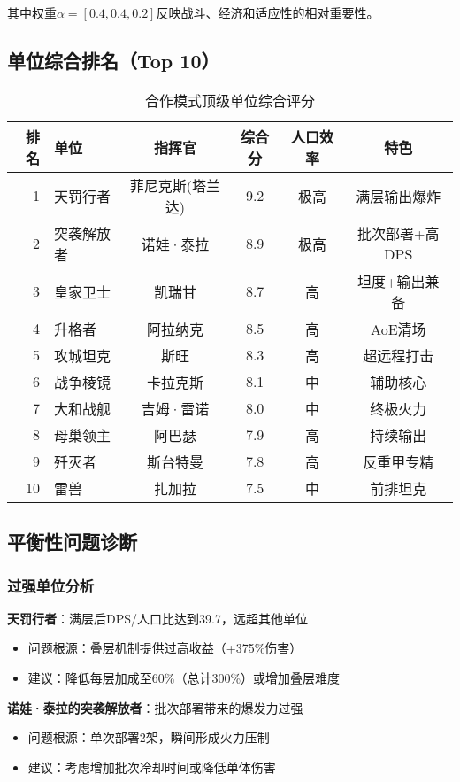 \documentclass[a4paper,12pt]{article}
\begin{document}
其中权重$\alpha = [0.4, 0.4, 0.2]$反映战斗、经济和适应性的相对重要性。

\subsection{单位综合排名（Top 10）}
\begin{table}[h]
\centering
\caption{合作模式顶级单位综合评分}
\begin{tabular}{rlcccc}
\toprule
\textbf{排名} & \textbf{单位} & \textbf{指挥官} & \textbf{综合分} & \textbf{人口效率} & \textbf{特色} \\
\midrule
1 & 天罚行者 & 菲尼克斯(塔兰达) & 9.2 & 极高 & 满层输出爆炸 \\
2 & 突袭解放者 & 诺娃·泰拉 & 8.9 & 极高 & 批次部署+高DPS \\
3 & 皇家卫士 & 凯瑞甘 & 8.7 & 高 & 坦度+输出兼备 \\
4 & 升格者 & 阿拉纳克 & 8.5 & 高 & AoE清场 \\
5 & 攻城坦克 & 斯旺 & 8.3 & 高 & 超远程打击 \\
6 & 战争棱镜 & 卡拉克斯 & 8.1 & 中 & 辅助核心 \\
7 & 大和战舰 & 吉姆·雷诺 & 8.0 & 中 & 终极火力 \\
8 & 母巢领主 & 阿巴瑟 & 7.9 & 高 & 持续输出 \\
9 & 歼灭者 & 斯台特曼 & 7.8 & 高 & 反重甲专精 \\
10 & 雷兽 & 扎加拉 & 7.5 & 中 & 前排坦克 \\
\bottomrule
\end{tabular}
\end{table}

\subsection{平衡性问题诊断}

\subsubsection{过强单位分析}
\textbf{天罚行者}：满层后DPS/人口比达到39.7，远超其他单位
\begin{itemize}
\item 问题根源：叠层机制提供过高收益（+375\%伤害）
\item 建议：降低每层加成至60\%（总计300\%）或增加叠层难度
\end{itemize}

\textbf{诺娃·泰拉的突袭解放者}：批次部署带来的爆发力过强
\begin{itemize}
\item 问题根源：单次部署2架，瞬间形成火力压制
\item 建议：考虑增加批次冷却时间或降低单体伤害
\end{itemize}
\end{document}
